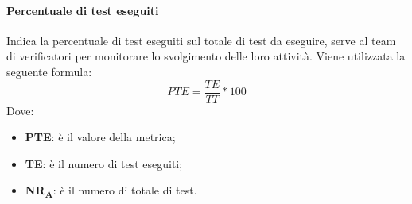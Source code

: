 \paragraph{Percentuale di test eseguiti} \Spazio
Indica la percentuale di test eseguiti sul totale di test da eseguire, serve al team di verificatori per monitorare lo svolgimento delle loro attività.
Viene utilizzata la seguente formula:
$$PTE=\frac{TE}{TT}*100$$
Dove:
\begin{itemize}
	\item{\textbf{PTE}: è il valore della metrica;}
	\item{\textbf{TE}: è il numero di test eseguiti;}
	\item{\textbf{NR\textsubscript{A}}: è il numero di totale di test.}
\end{itemize}
